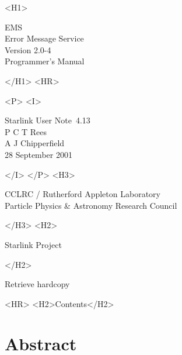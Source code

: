 \documentclass[twoside,11pt]{article}
\newcommand{\stardoccategory}  {Starlink User Note}
\newcommand{\stardocsource}    {sun\stardocnumber}
\newcommand{\stardocnumber}    {4.13}
\newcommand{\stardocauthors}   {P C T Rees \\
                                A J Chipperfield}
\newcommand{\stardocdate}      {28 September 2001}
\newcommand{\stardoctitle}     {EMS \\ [1ex]
                                Error Message Service}
\newcommand{\stardocversion}   {Version 2.0-4}
\newcommand{\stardocmanual}    {Programmer's Manual}
\newcommand{\htmladdnormallink}[2]{#1}
\newcommand{\htmladdimg}[1]{}
\newcommand{\htmlref}[2]{#1}
\newcommand{\htmladdtonavigation}[1]{}
\newcommand{\xlabel}[1]{}
\renewcommand{\_}{\texttt{\symbol{95}}}
\begin{document}
\begin{htmlonly}
   \xlabel{}
   \begin{rawhtml} <H1> \end{rawhtml}
      \stardoctitle\\
      \stardocversion\\
      \stardocmanual
   \begin{rawhtml} </H1> <HR> \end{rawhtml}


   \begin{rawhtml} <P> <I> \end{rawhtml}
   \stardoccategory\ \stardocnumber \\
   \stardocauthors \\
   \stardocdate
   \begin{rawhtml} </I> </P> <H3> \end{rawhtml}
      \htmladdnormallink{CCLRC / Rutherford Appleton Laboratory}
                        {http://www.cclrc.ac.uk} \\
      \htmladdnormallink{Particle Physics \& Astronomy Research Council}
                        {http://www.pparc.ac.uk} \\
   \begin{rawhtml} </H3> <H2> \end{rawhtml}
      \htmladdnormallink{Starlink Project}{http://www.starlink.rl.ac.uk/}
   \begin{rawhtml} </H2> \end{rawhtml}
   \htmladdnormallink{\htmladdimg{source.gif} Retrieve hardcopy}
      {http://www.starlink.rl.ac.uk/cgi-bin/hcserver?\stardocsource}\\

  \label{stardoccontents}
  \begin{rawhtml} 
    <HR>
    <H2>Contents</H2>
  \end{rawhtml}
  \htmladdtonavigation{\htmlref{\htmladdimg{contents_motif.gif}}
        {stardoccontents}}

  \section{\xlabel{abstract}Abstract}
\end{htmlonly}
\end{document}
